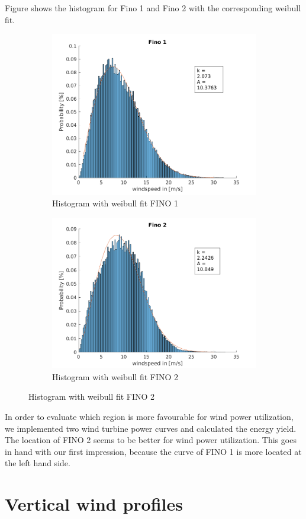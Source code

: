 \documentclass[10pt]{article}
\begin{document}
Figure shows the histogram for Fino 1 and Fino 2 with the corresponding weibull fit.
\begin{figure}[htb!]
\label{fig:WindRose1_valdidation}
\begin{subfigure}{0.5\textwidth}
  \centering
  \includegraphics[width=1\linewidth]{../figures/Hist_withfit_Fino1.png}
  \caption{Histogram with weibull fit FINO 1}
  \label{fig:Windrose_Fino1}
\end{subfigure}
\begin{subfigure}{0.5\textwidth}
  \centering
  \includegraphics[width=1\linewidth]{../figures/Hist_withfit_Fino2.png}
  \caption{Histogram with weibull fit FINO 2}
    \label{fig:Windrose_Fino2}
\end{subfigure}
\end{figure}
In order to evaluate which region is more favourable for wind power utilization, we implemented two wind turbine power curves and calculated the energy yield.
The location of FINO 2 seems to be better for wind power utilization. This goes in hand with our first impression, because the curve of FINO 1 is more located at the left hand side.

\section{Vertical wind profiles}
\end{document}
